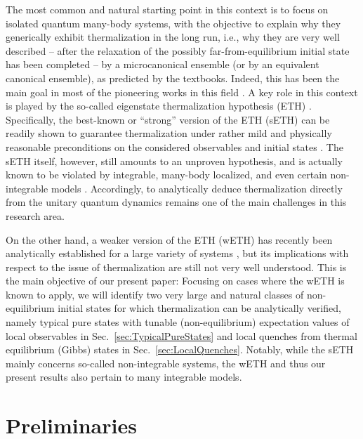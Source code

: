 \documentclass[twocolumn,aps,prb,floatfix,superscriptaddress]{revtex4-2}
\newcommand{\<}{\left\langle}	%
\renewcommand{\>}{\right\rangle}	%
\begin{document}
The most common and natural starting point in this
context is to focus on isolated quantum many-body 
systems, with the objective to explain why they
generically exhibit thermalization in the long run, i.e., 
why they are very well described -- after the relaxation 
of the possibly far-from-equilibrium initial state has 
been completed --
by a microcanonical ensemble
(or by an equivalent canonical ensemble), 
as predicted by the textbooks.
Indeed, this has been the main goal in most of the 
pioneering works in this field 
\cite{neu29,deu91,sre96,tas98}.
A key role in this context is played by the so-called 
eigenstate thermalization hypothesis (ETH)
\cite{neu29,deu91,sre94,rig08}.
Specifically, the 
best-known
or ``strong'' version of the
ETH (sETH) 
can be readily shown to guarantee thermalization 
under rather mild and physically reasonable preconditions 
on the considered observables and initial states
\cite{tas16,ued20,dal16,gog16,mor18}.
The sETH itself, however, still amounts to an 
unproven hypothesis,
and is actually known to be violated by integrable,
many-body localized, and even certain non-integrable 
models \cite{tas16,ued20,dal16,gog16,mor18}.
Accordingly, to analytically deduce thermalization
directly from the unitary quantum dynamics 
remains one of the main challenges
in this research area.

On the other hand, a weaker 
version of the ETH (wETH) has recently been analytically 
established for a large variety of systems
\cite{bir10,mor16,iyo17,mor18,kuw20,kuw20a},
but its implications 
with respect to the issue of thermalization are still not 
very well understood.
This
is the main objective of our present paper:
Focusing on 
cases where 
the wETH is known to apply, we will identify 
two very large and natural classes of non-equilibrium 
initial states for which thermalization can be 
analytically verified,
namely typical pure states with tunable (non-equilibrium) expectation values of local observables in Sec.~\ref{sec:TypicalPureStates}
and local quenches from thermal equilibrium (Gibbs) states in Sec.~\ref{sec:LocalQuenches}.
Notably, while the sETH mainly concerns so-called
non-integrable 
systems, the wETH and 
thus our present results also pertain to 
many integrable models.


\section{Preliminaries}
\label{sec:Preliminaries}
\end{document}
